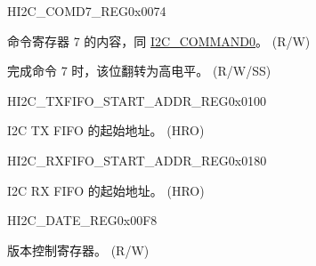 \begin{register}{H}{I2C\_COMD7\_REG}{0x0074}\label{regdesc:I2CCOMD7REG}
%
%
%
\regnewline%
\begin{regdesc}\begin{reglist}
\label{fielddesc:I2CCOMMAND7}\item [I2C\_COMMAND7] 命令寄存器 7 的内容，同 \hyperref[fielddesc:I2CCOMMAND0]{I2C\_COMMAND0}。 (R/W)
\label{fielddesc:I2CCOMMAND7DONE}\item [I2C\_COMMAND7\_DONE] 完成命令 7 时，该位翻转为高电平。 (R/W/SS)
\end{reglist}\end{regdesc}
\end{register}

\begin{register}{H}{I2C\_TXFIFO\_START\_ADDR\_REG}{0x0100}\label{regdesc:I2CTXFIFOSTARTADDRREG}
%
\regnewline%
\begin{regdesc}\begin{reglist}
\label{fielddesc:I2CTXFIFOSTARTADDR}\item [I2C\_TXFIFO\_START\_ADDR] I2C TX FIFO 的起始地址。 (HRO)
\end{reglist}\end{regdesc}
\end{register}


\begin{register}{H}{I2C\_RXFIFO\_START\_ADDR\_REG}{0x0180}\label{regdesc:I2CRXFIFOSTARTADDRREG}
%
\regnewline%
\begin{regdesc}\begin{reglist}
\label{fielddesc:I2CRXFIFOSTARTADDR}\item [I2C\_RXFIFO\_START\_ADDR] I2C RX FIFO 的起始地址。 (HRO)
\end{reglist}\end{regdesc}
\end{register}

\begin{register}{H}{I2C\_DATE\_REG}{0x00F8}\label{regdesc:I2CDATEREG}
%
\regnewline%
\begin{regdesc}\begin{reglist}
\label{fielddesc:I2CDATE}\item [I2C\_DATE] 版本控制寄存器。 (R/W)
\end{reglist}\end{regdesc}
\end{register}
